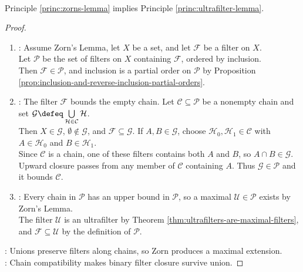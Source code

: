 \begin{theorem} \label{thm:ultrafilter-extension-under-zorn} \\
Principle \ref{princ:zorns-lemma} implies Principle \ref{princ:ultrafilter-lemma}.
\begin{proof}
\begin{enumerate}[label=(\roman*)]
\setlength{\itemsep}{0pt}
\item {}: Assume Zorn's Lemma, let $X$ be a set, and let $\mathcal{F}$ be a filter on $X$. \\
Let $\mathscr{P}$ be the set of filters on $X$ containing $\mathcal{F}$, ordered by inclusion.\\
Then $\mathcal{F}\in\mathscr{P}$, and inclusion is a partial order on $\mathscr{P}$ by Proposition \ref{prop:inclusion-and-reverse-inclusion-partial-orders}.
\item {}: The filter $\mathcal{F}$ bounds the empty chain. Let $\mathcal{C}\subseteq\mathscr{P}$ be a nonempty chain and set $\mathcal{G}\defeq\bigcup\limits_{\mathcal{H}\in\mathcal{C}}\mathcal{H}$.\\
Then $X\in\mathcal{G}$, $\emptyset\notin\mathcal{G}$, and $\mathcal{F}\subseteq\mathcal{G}$. If $A,B\in\mathcal{G}$, choose $\mathcal{H}_0,\mathcal{H}_1\in\mathcal{C}$ with $A\in\mathcal{H}_0$ and $B\in\mathcal{H}_1$.\\
Since $\mathcal{C}$ is a chain, one of these filters contains both $A$ and $B$, so $A\cap B\in\mathcal{G}$.\\
Upward closure passes from any member of $\mathcal{C}$ containing $A$. Thus $\mathcal{G}\in\mathscr{P}$ and it bounds $\mathcal{C}$.
\item {}: Every chain in $\mathscr{P}$ has an upper bound in $\mathscr{P}$, so a maximal $\mathcal{U}\in\mathscr{P}$ exists by Zorn's Lemma.\\
The filter $\mathcal{U}$ is an ultrafilter by Theorem \ref{thm:ultrafilters-are-maximal-filters}, and $\mathcal{F}\subseteq\mathcal{U}$ by the definition of $\mathscr{P}$.
\end{enumerate}
: Unions preserve filters along chains, so Zorn produces a maximal extension.\\
: Chain compatibility makes binary filter closure survive union.
\end{proof}
\end{theorem}

